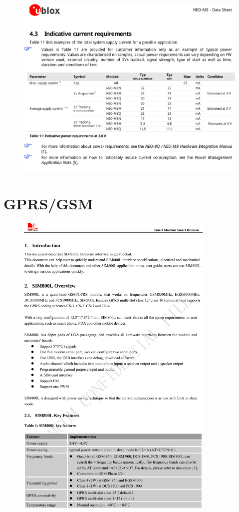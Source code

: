 \newpage
\begin{figure}[H]
\centering
\includegraphics[width=\textwidth]{gps_4.pdf}
\end{figure}




\section{GPRS/GSM}
\begin{figure}[H]
\centering
\includegraphics[width=0.85\textwidth]{gprs_1.pdf}
\end{figure}

